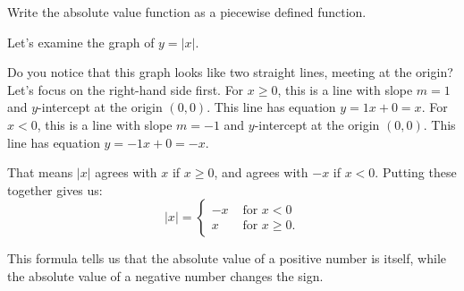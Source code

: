 \documentclass[nooutcomes]{ximera}
\begin{document}
	\begin{example}
		Write the absolute value function as a piecewise defined function.

		\begin{explanation}
		
			Let's examine the graph of $y=|x|$.
			\begin{image}
			\end{image}
			Do you notice that this graph looks like two straight lines, meeting at the origin? Let's focus on the right-hand side first. For $x \geq 0$, this is 
			a line with slope $m=1$ and $y$-intercept at the origin $(0,0)$. This line has equation $y = 1x+0 = x$.
			For $x < 0$, this is  a line with slope $m=-1$ and $y$-intercept at the origin $(0,0)$. This line has equation $y = -1x+0 = -x$.

			That means $|x|$ agrees with $x$ if $x \geq 0$, and agrees with $-x$ if $x < 0$. Putting these together gives us:
			$$ |x| = \begin{cases} -x & \text{ for } x < 0\\ x & \text{ for } x \geq 0.\end{cases}$$
			
			This formula tells us that the absolute value of a positive number is itself, while the absolute value of a negative number changes the sign.
		\end{explanation}
	\end{example}
\end{document}
